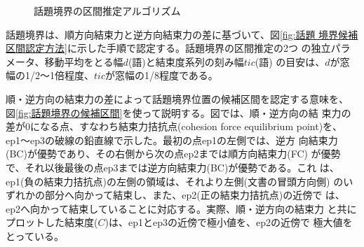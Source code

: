 \begin{figure}[htbp]
  \begin{center}
    
    \caption{話題境界の区間推定アルゴリズム}
    \label{fig:話題境界候補区間認定方法}
  \end{center}
\end{figure}

話題境界は、順方向結束力と逆方向結束力の差に基づいて、図\ref{fig:話題
  境界候補区間認定方法}に示した手順で認定する。話題境界の区間推定の2つ
の独立パラメータ、移動平均をとる幅$d$(語)と結束度系列の刻み幅$tic$(語)
の目安は、$d$が窓幅の1/2〜1倍程度、$tic$が窓幅の1/8程度である。

順・逆方向の結束力の差によって話題境界位置の候補区間を認定する意味を、
図\ref{fig:話題境界の候補区間}を使って説明する。図では、順・逆方向の結
束力の差が0になる点、すなわち結束力拮抗点(cohesion force equilibrium
point)を、ep1〜ep3の破線の鉛直線で示した。最初の点ep1の左側では、逆方
向結束力(BC)が優勢であり、その右側から次の点ep2までは順方向結束力(FC)
が優勢で、それ以後最後の点ep3までは逆方向結束力(BC)が優勢である。これ
は、ep1(負の結束力拮抗点)の左側の領域は、それより左側(文書の冒頭方向側)
のいずれかの部分へ向かって結束し、また、ep2(正の結束力拮抗点)の近傍で
は、ep2へ向かって結束していることに対応する。実際、順・逆方向の結束力
と共にプロットした結束度($C$)は、ep1とep3の近傍で極小値を、ep2の近傍で
極大値をとっている。

